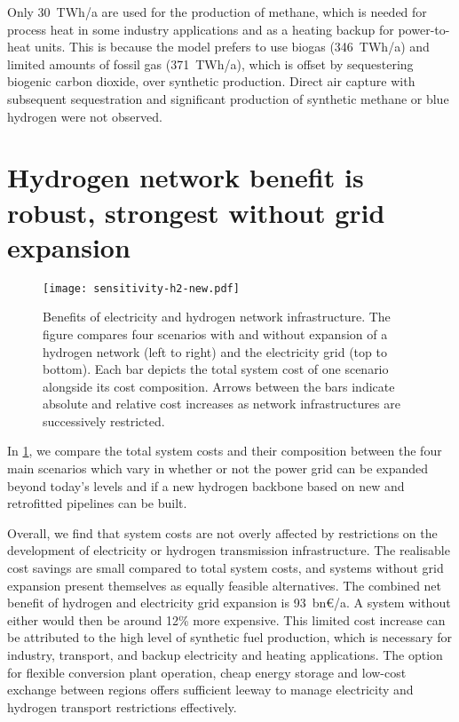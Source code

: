 
Only 30~TWh/a are used for the production of methane, which is needed for
process heat in some industry applications and as a heating backup for
power-to-heat units. This is because the model prefers to use biogas (346~TWh/a)
and limited amounts of fossil gas (371~TWh/a), which is offset by sequestering
biogenic carbon dioxide, over synthetic production. Direct air capture with
subsequent sequestration and significant production of  synthetic methane or
blue hydrogen were not observed.

\section*{Hydrogen network benefit is robust, strongest without grid expansion}
\label{sec:h2}

\begin{figure}
    \centering
    \texttt{[image: sensitivity-h2-new.pdf]}
    \caption{Benefits of electricity and hydrogen network infrastructure.
    The figure compares four scenarios with and without expansion of a hydrogen network (left to right) and the electricity grid (top to bottom).
    Each bar depicts the total system cost of one scenario alongside its cost composition.
    Arrows between the bars indicate absolute and relative cost increases
    as network infrastructures are successively restricted.}
    \label{fig:sensitivity-h2}
\end{figure}

In \cref{fig:sensitivity-h2}, we compare the total system costs and their
composition between the four main scenarios which vary in whether or not the
power grid can be expanded beyond today's levels and if a new hydrogen backbone
based on new and retrofitted pipelines can be built.


Overall, we find that system costs are not overly affected by restrictions on
the development of electricity or hydrogen transmission infrastructure. The
realisable cost savings are small compared to total system costs, and systems
without grid expansion present themselves as equally feasible alternatives. The
combined net benefit of hydrogen and electricity grid expansion is 93~bn\euro/a.
A system without either would then be around 12\% more expensive. This limited
cost increase can be attributed to the high level of synthetic fuel production,
which is necessary for industry, transport, and backup electricity and heating
applications. The option for flexible conversion plant operation, cheap energy
storage and low-cost exchange between regions offers sufficient leeway to
manage electricity and hydrogen transport restrictions effectively.


